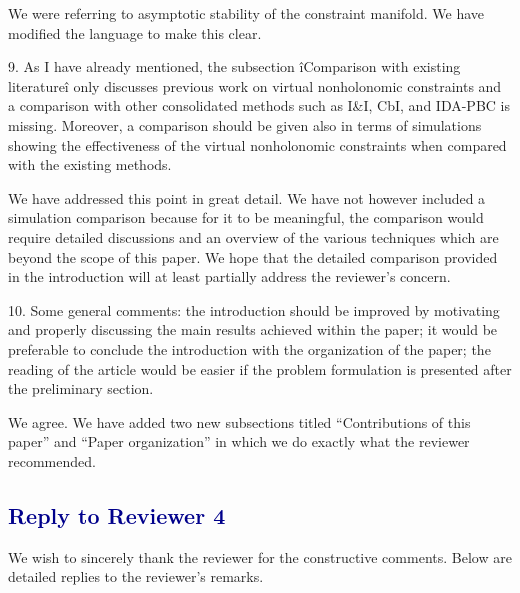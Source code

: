 \documentclass[11pt,letter]{article}
\newenvironment{myquote}{%
\bigskip%
\begin{tcolorbox}[]\footnotesize}{%
\end{tcolorbox}%
\bigskip}
\begin{document}
We were referring to asymptotic stability of the constraint manifold. We have modified the language to make this clear.

\begin{myquote}
9.	As I have already mentioned, the subsection îComparison with
existing literatureî only discusses previous work on virtual
nonholonomic constraints and a comparison with other consolidated
methods such as I\&I, CbI, and IDA-PBC is missing. Moreover, a
comparison should be given also in terms of simulations showing the
effectiveness of the virtual nonholonomic constraints when compared
with the existing methods.   
\end{myquote}


We have addressed this point in great detail. We have not however included a simulation comparison because for it to be meaningful, the comparison would require  detailed discussions and an overview of the various techniques  which are beyond the scope of this paper. We hope that the detailed comparison provided in the introduction will at least partially address the reviewer's concern.



\begin{myquote}
10.	Some general comments: the introduction should be improved by
motivating and properly discussing the main results achieved within the
paper; it would be preferable to conclude the introduction with the
organization of the paper; the reading of the article would be easier
if the problem formulation is presented after the preliminary section.  
\end{myquote}

We agree. We have added two new subsections titled ``Contributions of this paper'' and ``Paper organization'' in which we do exactly what the reviewer recommended.

\newpage
\vspace{0.2cm}
\subsection*{\textcolor{darkblue}{Reply to Reviewer 4}}
\vspace{0.2cm}


We wish to sincerely thank the reviewer for the constructive comments. Below are
detailed replies to the reviewer's remarks.
\end{document}
